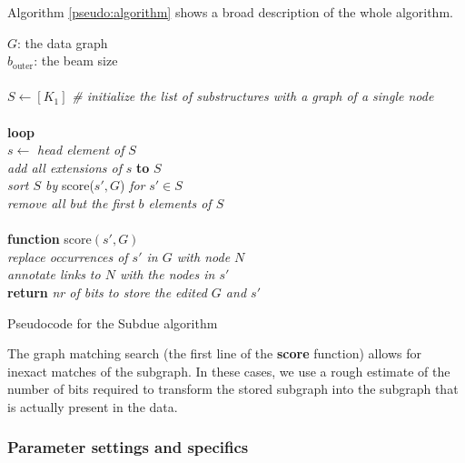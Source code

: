 \documentclass{article}
\begin{document}
Algorithm \ref{pseudo:algorithm} shows a broad description of the whole algorithm.

\begin{pseudo}[h]
{
	$G$: the data graph \\
	$b_{\mbox{outer}}$: the beam size \\
	\\
	$S \leftarrow [K_1]$ \textit{\#  initialize the list of substructures with a graph of a single node} \\
	\\
	\textbf{loop} \\
	\hspace*{5mm} $s \leftarrow $ \textit{head element of} $S$ \\
	\hspace*{5mm} \textit{add all extensions of} $s$ \textbf{to} $S$ \\
	
	\hspace*{5mm}\textit{sort $S$ by} score($s', G$) \textit{for} $s' \in S$\\
	\hspace*{5mm}\textit{remove all but the first $b$ elements of $S$} \\
	\\
	\textbf{function} score$(s', G)$\\
	\hspace*{5mm} \textit{replace occurrences of $s'$ in $G$ with node $N$}\\
	\hspace*{5mm} \textit{annotate links to $N$ with the nodes in $s'$}\\
	\hspace*{5mm} \textbf{return} \textit{nr of bits to store the edited $G$ and $s'$ }\\
}
	\caption{Pseudocode for the Subdue algorithm}
	
	\label{pseudo:algorithm}
\end{pseudo}

The graph matching search (the first line of the \textbf{score} function) allows for inexact matches of the subgraph. In these cases, we use a rough estimate of the number of bits required to transform the stored subgraph into the subgraph that is actually present in the data.

\subsubsection*{Parameter settings and specifics}
\end{document}
